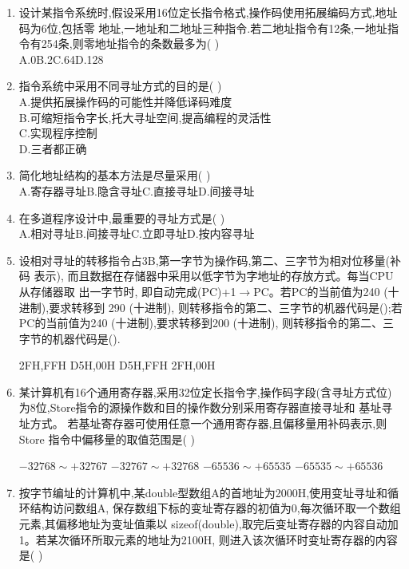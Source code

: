 \documentclass[12pt, a4paper, oneside, UTF8]{ctexbook}
\begin{document}
\begin{enumerate}
    \item \bt 设计某指令系统时,假设采用16位定长指令格式,操作码使用拓展编码方式,地址码为6位,包括零
    地址,一地址和二地址三种指令.若二地址指令有12条,一地址指令有254条,则零地址指令的条数最多为(   )\\
    A.0\qquad B.2\qquad C.64\qquad D.128

    \item 指令系统中采用不同寻址方式的目的是(   )\\
    A.提供拓展操作码的可能性并降低译码难度 \\
    B.可缩短指令字长,托大寻址空间,提高编程的灵活性 \\
    C.实现程序控制 \\
    D.三者都正确 

    \item 简化地址结构的基本方法是尽量采用(   ) \\
    A.寄存器寻址\qquad B.隐含寻址\qquad C.直接寻址\qquad D.间接寻址 

    \item 在多道程序设计中,最重要的寻址方式是(   ) \\
    A.相对寻址\qquad B.间接寻址\qquad C.立即寻址\qquad D.按内容寻址
    
    \item 设相对寻址的转移指令占3B,第一字节为操作码,第二、三字节为相对位移量(补码 表示),
    而且数据在存储器中采用以低字节为字地址的存放方式。每当CPU从存储器取 出一字节时,
    即自动完成(PC)+1$\rightarrow$PC。若PC的当前值为240 (十进制),要求转移到 290 (十进制),
    则转移指令的第二、三字节的机器代码是();若PC的当前值为240 (十进制),要求转移到200 (十进制),
    则转移指令的第二、三字节的机器代码是().
    \begin{choices}
        \task 2FH,FFH 
        \task D5H,00H 
        \task D5H,FFH 
        \task 2FH,00H
    \end{choices}

    \item 某计算机有16个通用寄存器,采用32位定长指令字,操作码字段(含寻址方式位)为8位,Store指令的源操作数和目的操作数分别采用寄存器直接寻址和 基址寻址方式。
    若基址寄存器可使用任意一个通用寄存器,且偏移量用补码表示,则Store 指令中偏移量的取值范围是(   ) 
    \begin{choices}[2]
        \task $-32768\sim +32767$ \task $-32767\sim +32768$ 
        \task $-65536\sim +65535$ \task $-65535\sim +65536$ 
    \end{choices}


    \item 按字节编址的计算机中,某double型数组A的首地址为2000H,使用变址寻址和循环结构访问数组A,
    保存数组下标的变址寄存器的初值为0,每次循环取一个数组元素,其偏移地址为变址值乘以
    sizeof(double),取完后变址寄存器的内容自动加1。若某次循环所取元素的地址为2100H,
    则进入该次循环时变址寄存器的内容是(   )
    \begin{choices}
       
    \end{choices} 


\end{enumerate}
\end{document}
